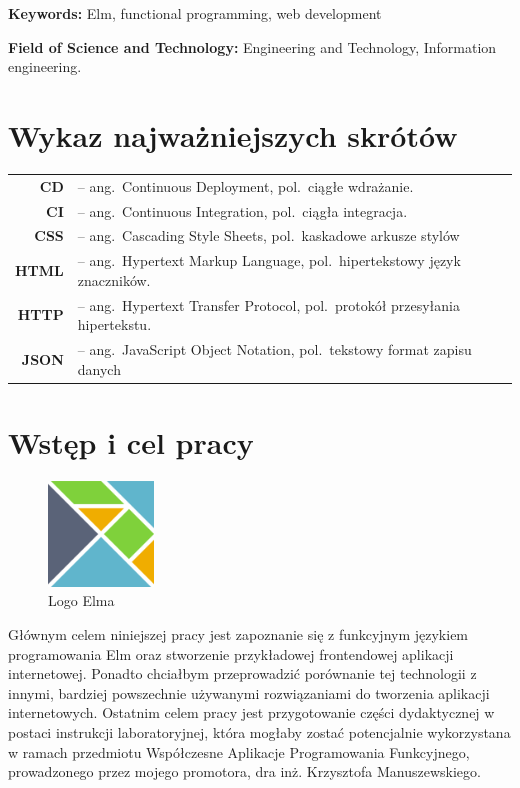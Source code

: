 \documentclass[twoside,a4paper]{report}
\begin{document}
\textbf{Keywords:} Elm, functional programming, web development

\textbf{Field of Science and Technology:} Engineering and Technology, Information engineering.


\tableofcontents


\chapter*{Wykaz najważniejszych skrótów}
\begin{tabular}{rl}
    \textbf{CD} &-- ang.~Continuous Deployment, pol.~ciągłe wdrażanie.\\
    \textbf{CI} &-- ang.~Continuous Integration, pol.~ciągła integracja.\\
    \textbf{CSS} &-- ang.~Cascading Style Sheets, pol.~kaskadowe arkusze stylów\\
    \textbf{HTML} &-- ang.~Hypertext Markup Language, pol.~hipertekstowy język znaczników.\\
    \textbf{HTTP} &-- ang.~Hypertext Transfer Protocol, pol.~protokół przesyłania hipertekstu.\\
    \textbf{JSON} &-- ang.~JavaScript Object Notation, pol.~tekstowy format zapisu danych\\
\end{tabular}


\chapter{Wstęp i cel pracy}
\begin{figure}
    \centering
    \centering
    \includegraphics[width=0.25\textwidth]{elm_logo.png}
    \caption*{Logo Elma}\label{fig:elm_logo}
\end{figure}
Głównym celem niniejszej pracy jest zapoznanie się z funkcyjnym językiem programowania Elm oraz stworzenie przykładowej frontendowej aplikacji internetowej.
Ponadto chciałbym przeprowadzić porównanie tej technologii z innymi, bardziej powszechnie używanymi rozwiązaniami do tworzenia aplikacji internetowych.
Ostatnim celem pracy jest przygotowanie części dydaktycznej w postaci instrukcji laboratoryjnej, która mogłaby zostać potencjalnie wykorzystana w ramach przedmiotu Współczesne Aplikacje Programowania Funkcyjnego, prowadzonego przez mojego promotora, dra inż. Krzysztofa Manuszewskiego.
\end{document}
